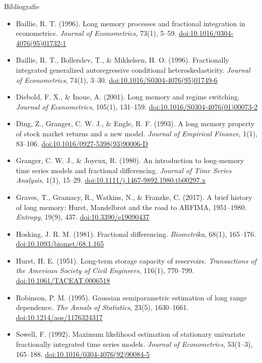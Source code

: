 \begin{frame}{Bibliografie}
\itemsize{\tiny}
\begin{itemize}
    \item Baillie, R. T. (1996). Long memory processes and fractional integration in econometrics. \textit{Journal of Econometrics}, 73(1), 5--59. \href{https://doi.org/10.1016/0304-4076(95)01732-1}{doi:10.1016/0304-4076(95)01732-1}
    \item Baillie, R. T., Bollerslev, T., \& Mikkelsen, H. O. (1996). Fractionally integrated generalized autoregressive conditional heteroskedasticity. \textit{Journal of Econometrics}, 74(1), 3--30. \href{https://doi.org/10.1016/S0304-4076(95)01749-6}{doi:10.1016/S0304-4076(95)01749-6}
    \item Diebold, F. X., \& Inoue, A. (2001). Long memory and regime switching. \textit{Journal of Econometrics}, 105(1), 131--159. \href{https://doi.org/10.1016/S0304-4076(01)00073-2}{doi:10.1016/S0304-4076(01)00073-2}
    \item Ding, Z., Granger, C. W. J., \& Engle, R. F. (1993). A long memory property of stock market returns and a new model. \textit{Journal of Empirical Finance}, 1(1), 83--106. \href{https://doi.org/10.1016/0927-5398(93)90006-D}{doi:10.1016/0927-5398(93)90006-D}
    \item Granger, C. W. J., \& Joyeux, R. (1980). An introduction to long-memory time series models and fractional differencing. \textit{Journal of Time Series Analysis}, 1(1), 15--29. \href{https://doi.org/10.1111/j.1467-9892.1980.tb00297.x}{doi:10.1111/j.1467-9892.1980.tb00297.x}
    \item Graves, T., Gramacy, R., Watkins, N., \& Franzke, C. (2017). A brief history of long memory: Hurst, Mandelbrot and the road to ARFIMA, 1951--1980. \textit{Entropy}, 19(9), 437. \href{https://doi.org/10.3390/e19090437}{doi:10.3390/e19090437}
    \item Hosking, J. R. M. (1981). Fractional differencing. \textit{Biometrika}, 68(1), 165--176. \href{https://doi.org/10.1093/biomet/68.1.165}{doi:10.1093/biomet/68.1.165}
    \item Hurst, H. E. (1951). Long-term storage capacity of reservoirs. \textit{Transactions of the American Society of Civil Engineers}, 116(1), 770--799. \href{https://doi.org/10.1061/TACEAT.0006518}{doi:10.1061/TACEAT.0006518}
    \item Robinson, P. M. (1995). Gaussian semiparametric estimation of long range dependence. \textit{The Annals of Statistics}, 23(5), 1630--1661. \href{https://doi.org/10.1214/aos/1176324317}{doi:10.1214/aos/1176324317}
    \item Sowell, F. (1992). Maximum likelihood estimation of stationary univariate fractionally integrated time series models. \textit{Journal of Econometrics}, 53(1--3), 165--188. \href{https://doi.org/10.1016/0304-4076(92)90084-5}{doi:10.1016/0304-4076(92)90084-5}
\end{itemize}
\end{frame}



